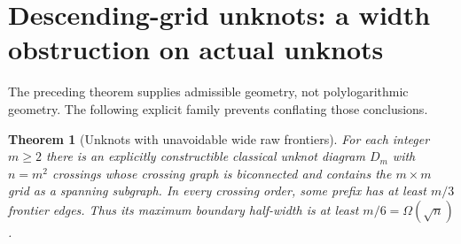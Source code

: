 \documentclass[11pt]{article}
\newtheorem{theorem}{Theorem}[section]
\theoremstyle{definition}\newtheorem{definition}[theorem]{Definition}
\theoremstyle{remark}\newtheorem{remark}[theorem]{Remark}
\begin{document}
\section{Descending-grid unknots: a width obstruction on actual unknots}
\label{sec:grid}
The preceding theorem supplies admissible geometry, not polylogarithmic geometry.
The following explicit family prevents conflating those conclusions.

\begin{theorem}[Unknots with unavoidable wide raw frontiers]\label{thm:grid}
For each integer $m\ge2$ there is an explicitly constructible classical unknot
diagram $D_m$ with $n=m^2$ crossings whose crossing graph is biconnected and contains
the $m\times m$ grid as a spanning subgraph. In every crossing order, some prefix
has at least $m/3$ frontier edges. Thus its maximum boundary half-width is at
least $m/6=\Omega(\sqrt n)$.
\end{theorem}
\end{document}
